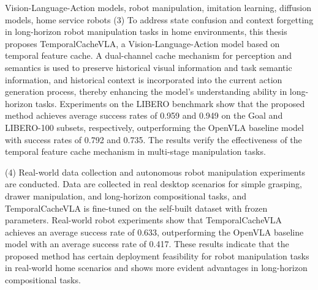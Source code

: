 \begin{englishabstract}{Vision-Language-Action models, robot manipulation, imitation learning, diffusion models, home service robots}
(3) To address state confusion and context forgetting in long-horizon robot manipulation tasks in home environments, this thesis proposes TemporalCacheVLA, a Vision-Language-Action model based on temporal feature cache. A dual-channel cache mechanism for perception and semantics is used to preserve historical visual information and task semantic information, and historical context is incorporated into the current action generation process, thereby enhancing the model's understanding ability in long-horizon tasks. Experiments on the LIBERO benchmark show that the proposed method achieves average success rates of 0.959 and 0.949 on the Goal and LIBERO-100 subsets, respectively, outperforming the OpenVLA baseline model with success rates of 0.792 and 0.735. The results verify the effectiveness of the temporal feature cache mechanism in multi-stage manipulation tasks.

(4) Real-world data collection and autonomous robot manipulation experiments are conducted. Data are collected in real desktop scenarios for simple grasping, drawer manipulation, and long-horizon compositional tasks, and TemporalCacheVLA is fine-tuned on the self-built dataset with frozen parameters. Real-world robot experiments show that TemporalCacheVLA achieves an average success rate of 0.633, outperforming the OpenVLA baseline model with an average success rate of 0.417. These results indicate that the proposed method has certain deployment feasibility for robot manipulation tasks in real-world home scenarios and shows more evident advantages in long-horizon compositional tasks.
\end{englishabstract}
